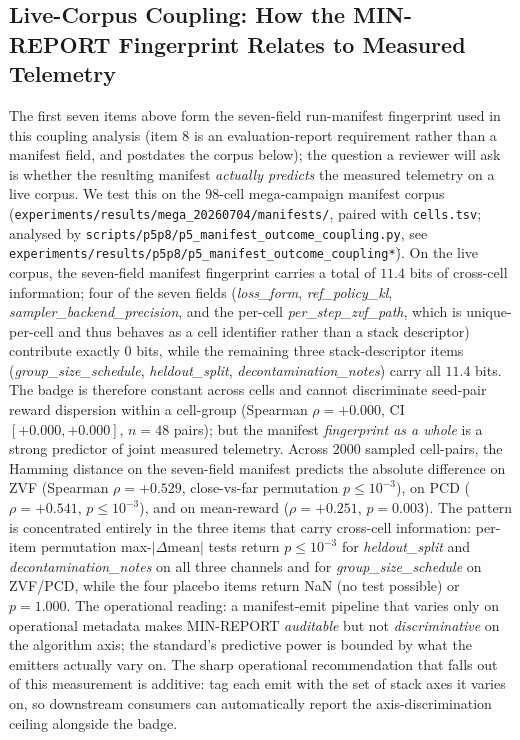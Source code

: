 \subsection{Live-Corpus Coupling: How the MIN-REPORT Fingerprint Relates to Measured Telemetry}
\label{sec:p5-live-coupling}
The first seven items above form the seven-field run-manifest fingerprint used in this
coupling analysis (item 8 is an evaluation-report requirement rather than
a manifest field, and postdates the corpus below); the question a
reviewer will ask is whether the resulting manifest \emph{actually predicts}
the measured telemetry on a live corpus. We test this on the
98-cell mega-campaign manifest corpus
(\texttt{experiments/results/mega\_20260704/manifests/}, paired with
\texttt{cells.tsv}; analysed by
\texttt{scripts/p5p8/p5\_manifest\_outcome\_coupling.py}, see
\texttt{experiments/results/p5p8/p5\_manifest\_outcome\_coupling\.*}). On
the live corpus, the seven-field manifest fingerprint carries a total of
$11.4$ bits of cross-cell information; four of the seven fields
(\textit{loss\_form}, \textit{ref\_policy\_kl},
\textit{sampler\_backend\_precision}, and the per-cell
\textit{per\_step\_zvf\_path}, which is unique-per-cell and thus
behaves as a cell identifier rather than a stack descriptor) contribute
exactly $0$ bits, while the remaining three stack-descriptor items
(\textit{group\_size\_schedule}, \textit{heldout\_split},
\textit{decontamination\_notes}) carry all $11.4$ bits. The badge is
therefore constant across cells and cannot discriminate seed-pair
reward dispersion within a cell-group (Spearman $\rho = +0.000$, CI
$[+0.000, +0.000]$, $n=48$ pairs); but the manifest \emph{fingerprint as a
whole} is a strong predictor of joint measured telemetry. Across
$2000$ sampled cell-pairs, the Hamming distance on the seven-field manifest
predicts the absolute difference on ZVF (Spearman $\rho = +0.529$,
close-vs-far permutation $p \le 10^{-3}$), on PCD
($\rho = +0.541$, $p \le 10^{-3}$), and on mean-reward
($\rho = +0.251$, $p = 0.003$). The pattern is concentrated entirely in
the three items that carry cross-cell information: per-item permutation
max-$|\Delta\text{mean}|$ tests return $p \le 10^{-3}$ for
\textit{heldout\_split} and \textit{decontamination\_notes} on all three
channels and for \textit{group\_size\_schedule} on ZVF/PCD, while the
four placebo items return NaN (no test possible) or $p = 1.000$. The
operational reading: a manifest-emit pipeline that varies only on
operational metadata makes MIN-REPORT \emph{auditable} but not
\emph{discriminative} on the algorithm axis; the standard's predictive
power is bounded by what the emitters actually vary on. The sharp
operational recommendation that falls out of this measurement is
additive: tag each emit with the set of stack axes it varies on, so
downstream consumers can automatically report the axis-discrimination
ceiling alongside the badge.

